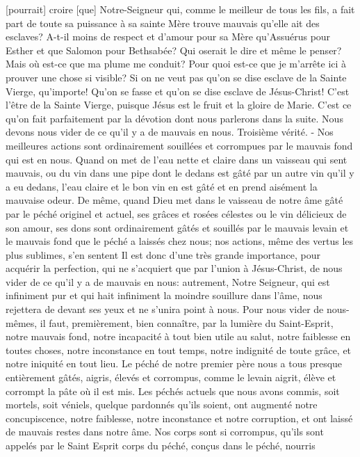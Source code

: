 [pourrait] croire [que] Notre-Seigneur qui, comme le meilleur de tous les fils, a fait part de toute sa puissance à sa
sainte Mère trouve mauvais qu'elle ait des esclaves? A-t-il moins de respect et d'amour pour sa Mère qu'Assuérus
pour Esther et que Salomon pour Bethsabée? Qui oserait le dire et même le penser?
 Mais où est-ce que ma plume me conduit? Pour quoi est-ce que je m'arrête ici à prouver une chose si visible?
Si on ne veut pas qu'on se dise esclave de la Sainte Vierge, qu'importe! Qu'on se fasse et qu'on se dise esclave
de Jésus-Christ! C'est l'être de la Sainte Vierge, puisque Jésus est le fruit et la gloire de Marie. C'est ce qu'on fait
parfaitement par la dévotion dont nous parlerons dans la suite.
Nous devons nous vider de ce qu'il y a de mauvais en nous.
 Troisième vérité. - Nos meilleures actions sont ordinairement souillées et corrompues par le mauvais fond qui
est en nous. Quand on met de l'eau nette et claire dans un vaisseau qui sent mauvais, ou du vin dans une pipe
dont le dedans est gâté par un autre vin qu'il y a eu dedans, l'eau claire et le bon vin en est gâté et en prend
aisément la mauvaise odeur. De même, quand Dieu met dans le vaisseau de notre âme gâté par le péché originel
et actuel, ses grâces et rosées célestes ou le vin délicieux de son amour, ses dons sont ordinairement gâtés et
souillés par le mauvais levain et le mauvais fond que le péché a laissés chez nous; nos actions, même des vertus
les plus sublimes, s'en sentent Il est donc d'une très grande importance, pour acquérir la perfection, qui ne
s'acquiert que par l'union à Jésus-Christ, de nous vider de ce qu'il y a de mauvais en nous: autrement, Notre
Seigneur, qui est infiniment pur et qui hait infiniment la moindre souillure dans l'âme, nous rejettera de devant ses
yeux et ne s'unira point à nous.
 Pour nous vider de nous-mêmes, il faut, premièrement, bien connaître, par la lumière du Saint-Esprit, notre
mauvais fond, notre incapacité à tout bien utile au salut, notre faiblesse en toutes choses, notre inconstance en
tout temps, notre indignité de toute grâce, et notre iniquité en tout lieu. Le péché de notre premier père nous a tous
presque entièrement gâtés, aigris, élevés et corrompus, comme le levain aigrit, élève et corrompt la pâte où il est
mis. Les péchés actuels que nous avons commis, soit mortels, soit véniels, quelque pardonnés qu'ils soient, ont
augmenté notre concupiscence, notre faiblesse, notre inconstance et notre corruption, et ont laissé de mauvais
restes dans notre âme.
Nos corps sont si corrompus, qu'ils sont appelés par le Saint Esprit corps du péché, conçus dans le péché, nourris
